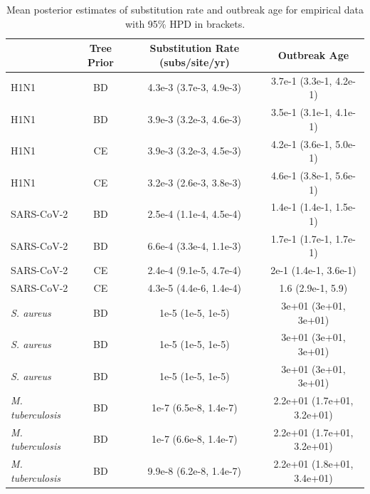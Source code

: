 \documentclass{article}
\begin{document}
\begin{table}[]
    \centering
    \caption{Mean posterior estimates of substitution rate and outbreak age for empirical data with 95\% HPD in brackets.}
    \begin{tabular}{lccc}
        \toprule
         & Tree Prior & Substitution Rate (subs/site/yr) & Outbreak Age\\
        \midrule
        H1N1 & BD & 4.3e-3 (3.7e-3, 4.9e-3) & 3.7e-1 (3.3e-1, 4.2e-1)\\
        H1N1 & BD & 3.9e-3 (3.2e-3, 4.6e-3) & 3.5e-1 (3.1e-1, 4.1e-1)\\
        \addlinespace
        H1N1 & CE & 3.9e-3 (3.2e-3, 4.5e-3) & 4.2e-1 (3.6e-1, 5.0e-1)\\
        H1N1 & CE & 3.2e-3 (2.6e-3, 3.8e-3) & 4.6e-1 (3.8e-1, 5.6e-1)\\
        \addlinespace
        SARS-CoV-2 & BD & 2.5e-4 (1.1e-4, 4.5e-4) & 1.4e-1 (1.4e-1, 1.5e-1)\\
        SARS-CoV-2 & BD & 6.6e-4 (3.3e-4, 1.1e-3) & 1.7e-1 (1.7e-1, 1.7e-1)\\
        \addlinespace
        SARS-CoV-2 & CE & 2.4e-4 (9.1e-5, 4.7e-4) & 2e-1 (1.4e-1, 3.6e-1)\\
        SARS-CoV-2 & CE & 4.3e-5 (4.4e-6, 1.4e-4) & 1.6 (2.9e-1, 5.9)\\
        \addlinespace
        \textit{S. aureus} & BD & 1e-5 (1e-5, 1e-5) & 3e+01 (3e+01, 3e+01)\\
        \textit{S. aureus} & BD & 1e-5 (1e-5, 1e-5) & 3e+01 (3e+01, 3e+01)\\
        \textit{S. aureus} & BD & 1e-5 (1e-5, 1e-5) & 3e+01 (3e+01, 3e+01)\\
        \addlinespace
        \textit{M. tuberculosis} & BD & 1e-7 (6.5e-8, 1.4e-7) & 2.2e+01 (1.7e+01, 3.2e+01)\\
        \textit{M. tuberculosis} & BD & 1e-7 (6.6e-8, 1.4e-7) & 2.2e+01 (1.7e+01, 3.2e+01)\\
        \textit{M. tuberculosis} & BD & 9.9e-8 (6.2e-8, 1.4e-7) & 2.2e+01 (1.8e+01, 3.4e+01)\\
        \bottomrule
    \end{tabular}

    \label{tab:emp-clock-age}
\end{table}
\end{document}

